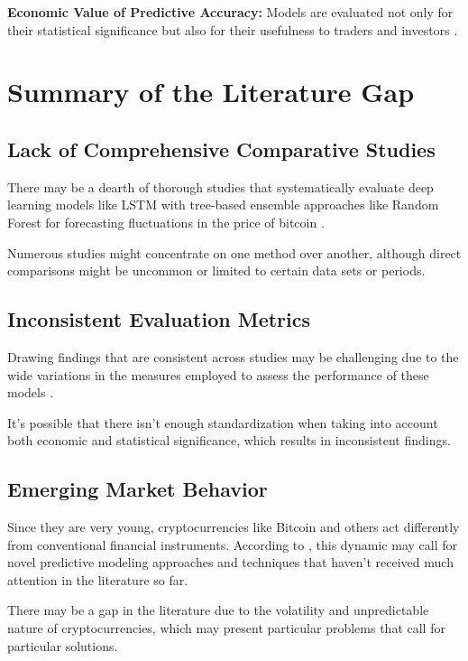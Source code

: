 \textbf{Economic Value of Predictive Accuracy:} Models are evaluated not only for their statistical significance but also for their usefulness to traders and investors \citep{26d24c7c-b91e-306e-b000-d5246fb6c3cb}.

\goodbreak
\section{Summary of the Literature Gap}
\goodbreak

\subsection{Lack of Comprehensive Comparative Studies}
\goodbreak

There may be a dearth of thorough studies that systematically evaluate deep learning models like LSTM with tree-based ensemble approaches like Random Forest for forecasting fluctuations in the price of bitcoin \citep{8631923}.

Numerous studies might concentrate on one method over another, although direct comparisons might be uncommon or limited to certain data sets or periods.

\subsection{Inconsistent Evaluation Metrics}

Drawing findings that are consistent across studies may be challenging due to the wide variations in the measures employed to assess the performance of these models \citep{doi:10.1198/016214506000001437}.
\smallskip

It's possible that there isn't enough standardization when taking into account both economic and statistical significance, which results in inconsistent findings.

\subsection{Emerging Market Behavior}

Since they are very young, cryptocurrencies like Bitcoin and others act differently from conventional financial instruments. According to \citet{nadarajah2017inefficiency}, this dynamic may call for novel predictive modeling approaches and techniques that haven't received much attention in the literature so far.

There may be a gap in the literature due to the volatility and unpredictable nature of cryptocurrencies, which may present particular problems that call for particular solutions.

